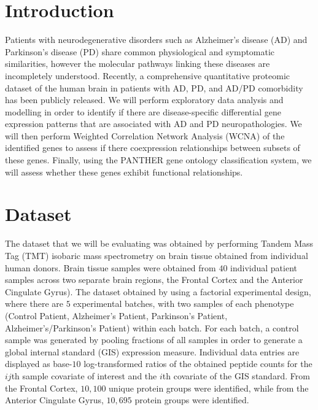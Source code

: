 \section{Introduction}
\label{sec:introduction}

Patients with neurodegenerative disorders such as Alzheimer’s disease (AD) and Parkinson’s disease (PD) share common physiological and symptomatic similarities, however the molecular pathways linking these diseases are incompletely understood. Recently, a comprehensive quantitative proteomic dataset of the human brain in patients with AD, PD, and AD/PD comorbidity has been publicly released. We will perform exploratory data analysis and modelling in order to identify if there are disease-specific differential gene expression patterns that are associated with AD and PD neuropathologies. We will then perform Weighted Correlation Network Analysis (WCNA) of the identified genes to assess if there coexpression relationships between subsets of these genes. Finally, using the PANTHER gene ontology classification system, we will assess whether these genes exhibit functional relationships. 



\section{Dataset}
\label{sec:dataset}

The dataset\cite{proteome} that we will be evaluating was obtained by performing Tandem Mass Tag (TMT) isobaric mass spectrometry on brain tissue obtained from individual human donors. Brain tissue samples were obtained from $40$ individual patient samples across two separate brain regions, the Frontal Cortex and the Anterior Cingulate Gyrus). The dataset obtained by using a factorial experimental design, where there are $5$ experimental batches, with two samples of each phenotype (Control Patient, Alzheimer’s Patient, Parkinson’s Patient, Alzheimer’s/Parkinson’s Patient) within each batch. For each batch, a control sample was generated by pooling fractions of all samples in order to generate a global internal standard (GIS) expression measure. Individual data entries are displayed as base-$10$ log-transformed ratios of the obtained peptide counts for the $ij$th sample covariate of interest and the $i$th covariate of the GIS standard. From the Frontal Cortex, $10,100$ unique protein groups were identified, while from the Anterior Cingulate Gyrus, $10,695$ protein groups were identified.

